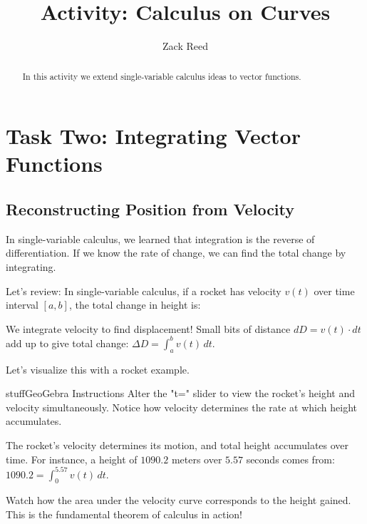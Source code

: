 \documentclass{ximera}
\title{Activity: Calculus on Curves}
\author{Zack Reed}
\begin{document}
\begin{abstract}
In this activity we extend single-variable calculus ideas to vector functions.
\end{abstract}
\maketitle

\section*{Task Two: Integrating Vector Functions}

\subsection*{Reconstructing Position from Velocity}

In single-variable calculus, we learned that integration is the reverse of differentiation. If we know the rate of change, we can find the total change by integrating.

\begin{problem}
Let's review: In single-variable calculus, if a rocket has velocity $v(t)$ over time interval $[a,b]$, the total change in height is:

\begin{multipleChoice}
\end{multipleChoice}

\begin{feedback}
We integrate velocity to find displacement! Small bits of distance $dD = v(t) \cdot dt$ add up to give total change: $\Delta D = \int_a^b v(t) \, dt$.
\end{feedback}
\end{problem}

\begin{problem}
Let's visualize this with a rocket example.

\begin{expandable}{stuff}{GeoGebra Instructions}
    Alter the "t=" slider to view the rocket's height and velocity simultaneously. Notice how velocity determines the rate at which height accumulates.
\end{expandable}

\begin{center}
\end{center}

The rocket's velocity determines its motion, and total height accumulates over time. For instance, a height of $1090.2$ meters over $5.57$ seconds comes from: $1090.2 = \int_0^{5.57} v(t) \, dt$.

\begin{feedback}
Watch how the area under the velocity curve corresponds to the height gained. This is the fundamental theorem of calculus in action!
\end{feedback}
\end{problem}
\end{document}

